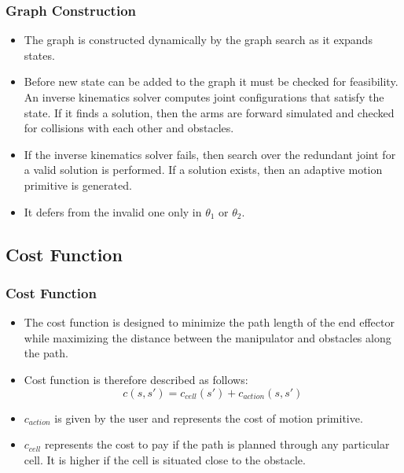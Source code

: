 \documentclass{beamer}
\begin{document}
\begin{frame}
\frametitle{Graph Construction}
\begin{itemize}
  \item The graph is constructed dynamically by the graph search as it expands
  states.
  \item Before new state can be added to the graph it must be checked for
  feasibility. An inverse kinematics solver computes joint configurations that satisfy the state. If it finds a solution, then the arms are forward simulated and checked for collisions with each other and obstacles. 
  \item If the inverse kinematics solver fails, then search over the redundant
  joint for a valid solution is performed. If a solution exists, then an adaptive motion primitive is generated. 
  \item It defers from the invalid one only in $\theta_1$ or $\theta_2$.
\end{itemize}
\end{frame}
 

\subsection{Cost Function} 
\begin{frame}
\frametitle{Cost Function}
\begin{itemize} 
  \item The cost function is designed to minimize the path length of the end
  effector while maximizing the distance between the manipulator and obstacles along the path.
  \item Cost function is therefore described as follows:$$
  c(s,s')=c_{cell}(s')+c_{action}(s,s')$$
  \item $c_{action}$ is given by the user and represents the cost
  of motion primitive.
  \item $c_{cell}$ represents the cost to pay if the path is planned
  through any particular cell.
  It is higher if the cell is situated close to the obstacle.
  
\end{itemize}
\end{frame}
\end{document}
